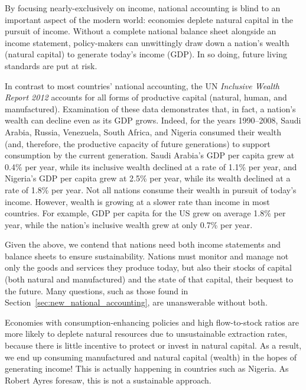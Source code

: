 By focusing nearly-exclusively on income, 
national accounting is blind to an important aspect of the modern world:
economies deplete natural capital in the pursuit of income.
Without a complete national balance sheet alongside an income statement, 
policy-makers can unwittingly draw down a nation's wealth (natural capital) 
to generate today's income (GDP). 
In so doing, future living standards are put at risk. 

In contrast to most countries' national accounting, 
the UN \emph{Inclusive Wealth Report 2012}
accounts for all forms of productive capital 
(natural, human, and manufactured).\cite{IWR2012}  
Examination of these data demonstrates that, in fact, 
a nation's wealth can decline even as its GDP grows. 
Indeed, for the years 1990--2008, Saudi Arabia, Russia, Venezuela, South Africa, and Nigeria 
consumed their wealth (and, therefore, the productive capacity of future generations) 
to support consumption by the current generation.
Saudi Arabia's GDP per capita grew at 0.4\% per year, 
while its inclusive wealth declined at a rate of 1.1\% per year, 
and Nigeria's GDP per capita grew at 2.5\% per year, 
while its wealth declined at a rate of 1.8\% per year.
Not all nations consume their wealth in pursuit of today's income. 
However, wealth is growing at a slower rate than income
in most countries.
For example, GDP per capita for the US grew on average 1.8\% per year, 
while the nation's inclusive wealth grew at only 0.7\% per year.\cite[p.~44]{IWR2012}

Given the above, we contend that nations need both 
income statements and
balance sheets
to ensure sustainability. 
Nations must monitor and manage not only the goods and services they produce today, 
but also their stocks of capital (both natural and manufactured)
and the state of that capital, their bequest to the future. 
Many questions, such as those found in Section~\ref{sec:new_national_accounting},
are unanswerable without both.





Economies with consumption-enhancing policies and high flow-to-stock ratios
are more likely to deplete natural resources due to unsustainable extraction rates, 
because there is little incentive to protect or invest in natural capital. 
As a result, we end up consuming manufactured and natural capital (wealth) 
in the hopes of generating income! This is actually happening in 
countries such as Nigeria. As Robert Ayres foresaw, this is not 
a sustainable approach.

